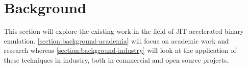 \section{Background}
\label{section:background}

This section will explore the existing work in the field of JIT accelerated binary emulation. \autoref{section:background-academia} will focus on academic work and research whereas \autoref{section:background-industry} will look at the application of these techniques in industry, both in commercial and open source projects.


